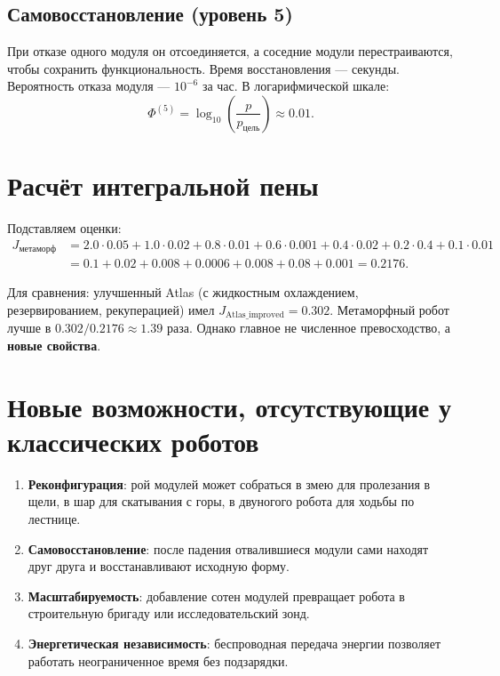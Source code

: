 \documentclass[12pt,a4paper]{article}
\begin{document}
\subsection{Самовосстановление (уровень 5)}

При отказе одного модуля он отсоединяется, а соседние модули перестраиваются, чтобы сохранить функциональность. Время восстановления — секунды. Вероятность отказа модуля — \(10^{-6}\) за час. В логарифмической шкале:
\[
\Phi^{(5)} = \log_{10}\left(\frac{p}{p_{\text{цель}}}\right) \approx 0.01.
\]

\section{Расчёт интегральной пены}

Подставляем оценки:
\[
\begin{aligned}
J_{\text{метаморф}} &= 2.0\cdot0.05 + 1.0\cdot0.02 + 0.8\cdot0.01 + 0.6\cdot0.001 + 0.4\cdot0.02 + 0.2\cdot0.4 + 0.1\cdot0.01 \\
&= 0.1 + 0.02 + 0.008 + 0.0006 + 0.008 + 0.08 + 0.001 = 0.2176.
\end{aligned}
\]

Для сравнения: улучшенный Atlas (с жидкостным охлаждением, резервированием, рекуперацией) имел \(J_{\text{Atlas\_improved}} = 0.302\). Метаморфный робот лучше в \(0.302/0.2176 \approx 1.39\) раза. Однако главное не численное превосходство, а \textbf{новые свойства}.

\section{Новые возможности, отсутствующие у классических роботов}

\begin{enumerate}
    \item \textbf{Реконфигурация}: рой модулей может собраться в змею для пролезания в щели, в шар для скатывания с горы, в двуногого робота для ходьбы по лестнице.
    \item \textbf{Самовосстановление}: после падения отвалившиеся модули сами находят друг друга и восстанавливают исходную форму.
    \item \textbf{Масштабируемость}: добавление сотен модулей превращает робота в строительную бригаду или исследовательский зонд.
    \item \textbf{Энергетическая независимость}: беспроводная передача энергии позволяет работать неограниченное время без подзарядки.
\end{enumerate}
\end{document}
